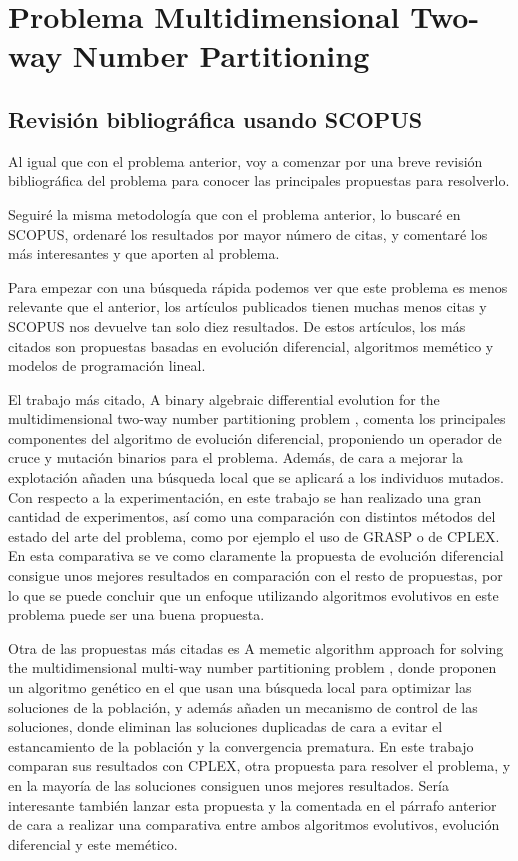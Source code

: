 \newpage

\section{Problema Multidimensional Two-way Number Partitioning}

\subsection{Revisión bibliográfica usando SCOPUS}

Al igual que con el problema anterior, voy a comenzar por una breve revisión bibliográfica del problema para conocer las principales propuestas para resolverlo.

Seguiré la misma metodología que con el problema anterior, lo buscaré en SCOPUS, ordenaré los resultados por mayor número de citas, y comentaré los más interesantes y que aporten al problema.

Para empezar con una búsqueda rápida podemos ver que este problema es menos relevante que el anterior, los artículos publicados tienen muchas menos citas y SCOPUS nos devuelve tan solo diez resultados. De estos artículos, los más citados son propuestas basadas en evolución diferencial, algoritmos memético y modelos de programación lineal.

El trabajo más citado, A binary algebraic differential evolution for the multidimensional two-way number partitioning problem \cite{evolucionDiferencialM2NP}, comenta los principales componentes del algoritmo de evolución diferencial, proponiendo un operador de cruce y mutación binarios para el problema. Además, de cara a mejorar la explotación añaden una búsqueda local que se aplicará a los individuos mutados. Con respecto a la experimentación, en este trabajo se han realizado una gran cantidad de experimentos, así como una comparación con distintos métodos del estado del arte del problema, como por ejemplo el uso de GRASP o de CPLEX. En esta comparativa se ve como claramente la propuesta de evolución diferencial consigue unos mejores resultados en comparación con el resto de propuestas, por lo que se puede concluir que un enfoque utilizando algoritmos evolutivos en este problema puede ser una buena propuesta.


Otra de las propuestas más citadas es A memetic algorithm approach for solving the multidimensional multi-way number partitioning problem \cite{memeticoM2NP}, donde proponen un algoritmo genético en el que usan una búsqueda local para optimizar las soluciones de la población, y además añaden un mecanismo de control de las soluciones, donde eliminan las soluciones duplicadas de cara a evitar el estancamiento de la población y la convergencia prematura. En este trabajo comparan sus resultados con CPLEX, otra propuesta para resolver el problema, y en la mayoría de las soluciones consiguen unos mejores resultados. Sería interesante también lanzar esta propuesta y la comentada en el párrafo anterior de cara a realizar una comparativa entre ambos algoritmos evolutivos, evolución diferencial y este memético.

